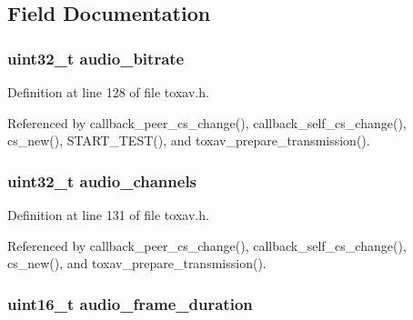 \subsection{Field Documentation}
\hypertarget{struct___tox_av_c_settings_a5d9a8b59b2eb1eef8dbdcb032bf1dd01}{
\subsubsection[{audio\+\_\+bitrate}]{\setlength{\rightskip}{0pt plus 5cm}uint32\+\_\+t audio\+\_\+bitrate}}\label{struct___tox_av_c_settings_a5d9a8b59b2eb1eef8dbdcb032bf1dd01}


Definition at line 128 of file toxav.\+h.



Referenced by callback\+\_\+peer\+\_\+cs\+\_\+change(), callback\+\_\+self\+\_\+cs\+\_\+change(), cs\+\_\+new(), S\+T\+A\+R\+T\+\_\+\+T\+E\+S\+T(), and toxav\+\_\+prepare\+\_\+transmission().

\hypertarget{struct___tox_av_c_settings_a1b04e9669a2929f425e867440b6d826d}{
\subsubsection[{audio\+\_\+channels}]{\setlength{\rightskip}{0pt plus 5cm}uint32\+\_\+t audio\+\_\+channels}}\label{struct___tox_av_c_settings_a1b04e9669a2929f425e867440b6d826d}


Definition at line 131 of file toxav.\+h.



Referenced by callback\+\_\+peer\+\_\+cs\+\_\+change(), callback\+\_\+self\+\_\+cs\+\_\+change(), cs\+\_\+new(), and toxav\+\_\+prepare\+\_\+transmission().

\hypertarget{struct___tox_av_c_settings_a61b592233f5a65705eb2600d38e365cd}{
\subsubsection[{audio\+\_\+frame\+\_\+duration}]{\setlength{\rightskip}{0pt plus 5cm}uint16\+\_\+t audio\+\_\+frame\+\_\+duration}}\label{struct___tox_av_c_settings_a61b592233f5a65705eb2600d38e365cd}


